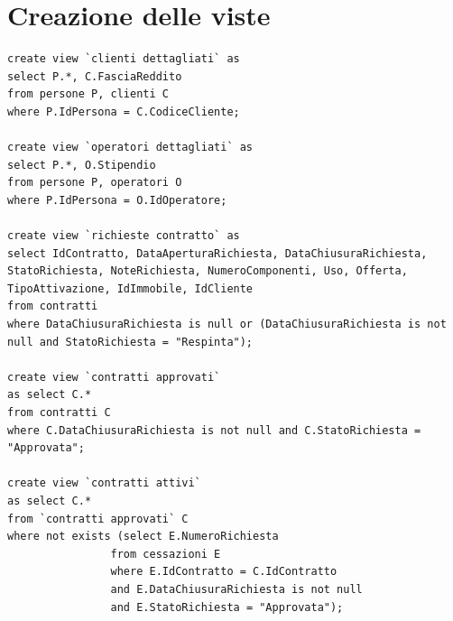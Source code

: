 \documentclass[a4paper,12pt]{report}
\begin{document}
\section{Creazione delle viste}
\begin{lstlisting}
create view `clienti dettagliati` as
select P.*, C.FasciaReddito
from persone P, clienti C
where P.IdPersona = C.CodiceCliente;
 
create view `operatori dettagliati` as
select P.*, O.Stipendio
from persone P, operatori O
where P.IdPersona = O.IdOperatore;
   
create view `richieste contratto` as
select IdContratto, DataAperturaRichiesta, DataChiusuraRichiesta, StatoRichiesta, NoteRichiesta, NumeroComponenti, Uso, Offerta, TipoAttivazione, IdImmobile, IdCliente
from contratti
where DataChiusuraRichiesta is null or (DataChiusuraRichiesta is not null and StatoRichiesta = "Respinta");
   
create view `contratti approvati`
as select C.*
from contratti C
where C.DataChiusuraRichiesta is not null and C.StatoRichiesta = "Approvata";
                                      
create view `contratti attivi`
as select C.*
from `contratti approvati` C
where not exists (select E.NumeroRichiesta
                from cessazioni E
                where E.IdContratto = C.IdContratto
                and E.DataChiusuraRichiesta is not null
                and E.StatoRichiesta = "Approvata");
\end{lstlisting}
\end{document}

